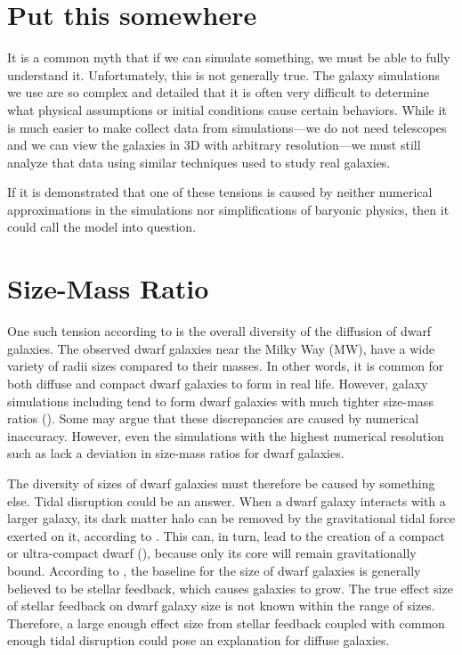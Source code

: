 \section{Put this somewhere}
It is a common myth that if we can simulate something, we must be able to fully understand it. Unfortunately, this is not generally true. The galaxy simulations we use are so complex and detailed that it is often very difficult to determine what physical assumptions or initial conditions cause certain behaviors. While it is much easier to make collect data from simulations---we do not need telescopes and we can view the galaxies in 3D with arbitrary resolution---we must still analyze that data using similar techniques used to study real galaxies.

If it is demonstrated that one of these tensions is caused by neither numerical approximations in the simulations nor simplifications of baryonic physics, then it could call the \lcdm\* model into question.


\section{Size-Mass Ratio}

One such tension according to \cite{salesBaryonicSolutionsChallenges2022} is the overall diversity of the diffusion of dwarf galaxies. The observed dwarf galaxies near the Milky Way (MW), have a wide variety of radii sizes compared to their masses. In other words, it is common for both diffuse and compact dwarf galaxies to form in real life. However, galaxy simulations including \cite{fittsFireFieldSimulating2017} tend to form dwarf galaxies with much tighter size-mass ratios (\cite{salesBaryonicSolutionsChallenges2022}). Some may argue that these discrepancies are caused by numerical inaccuracy. However, even the simulations with the highest numerical resolution such as \cite{wheelerBeItTherefore2019} lack a deviation in size-mass ratios for dwarf galaxies. 

The diversity of sizes of dwarf galaxies must therefore be caused by something else. Tidal disruption could be an answer. When a dwarf galaxy interacts with a larger galaxy, its dark matter halo can be removed by the gravitational tidal force exerted on it, according to \cite{morenoGalaxiesLackingDark2022}. This can, in turn, lead to the creation of a compact or ultra-compact dwarf (\cite{applebaumUltrafaintDwarfsMilky2021}), because only its core will remain gravitationally bound. According to \cite{salesBaryonicSolutionsChallenges2022}, the baseline for the size of dwarf galaxies is generally believed to be stellar feedback, which causes galaxies to grow. The true effect size of stellar feedback on dwarf galaxy size is not known within the range of sizes. Therefore, a large enough effect size from stellar feedback coupled with common enough tidal disruption could pose an explanation for diffuse galaxies.

